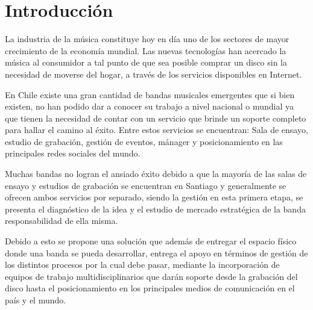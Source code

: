 \section{Introducción}
La industria de la música constituye hoy en día uno de los sectores de mayor
crecimiento de la economía mundial. Las nuevas tecnologías han acercado la música
al consumidor a tal punto de que sea posible comprar un disco sin la necesidad
de moverse del hogar, a través de los servicios disponibles en Internet.

En Chile existe una gran cantidad de bandas musicales emergentes que si bien existen, no han podido dar a conocer su trabajo a nivel nacional o mundial ya que
tienen la  necesidad de contar con un servicio que brinde un soporte completo para hallar el camino al éxito. 
Entre estos servicios se encuentran:
Sala de ensayo, estudio de grabación, gestión de eventos, mánager y
posicionamiento en las principales redes sociales del mundo.

Muchas bandas no logran el ansiado éxito debido a que la mayoría de las 
salas de ensayo y estudios de grabación se encuentran en Santiago y generalmente
se ofrecen ambos servicios por separado, siendo la gestión en esta primera etapa, se presenta el diagnóstico de la idea y el estudio de mercado estratégica de la banda 
responsabilidad de ella misma. 

Debido a esto se propone una solución que además
de entregar el espacio físico donde una banda se pueda desarrollar, entrega el 
apoyo en términos de gestión de los distintos procesos por la cual debe pasar, 
mediante la incorporación de equipos de trabajo multidisciplinarios que darán soporte
desde la grabación del disco hasta el posicionamiento en los principales 
medios de comunicación en el país y el mundo.
